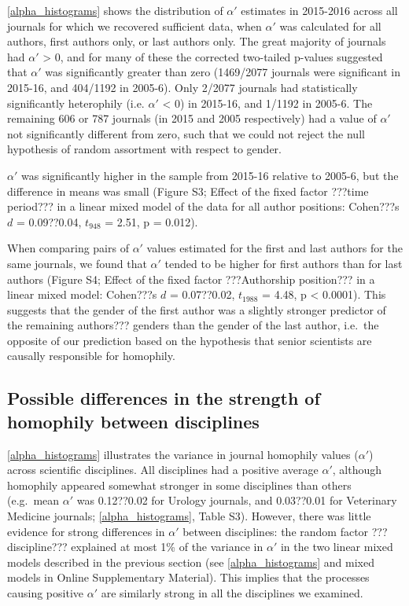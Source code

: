 \documentclass[12pt,]{article}
\begin{document}
\autoref{alpha_histograms} shows the distribution of \(\alpha'\)
estimates in 2015-2016 across all journals for which we recovered
sufficient data, when \(\alpha'\) was calculated for all authors, first
authors only, or last authors only. The great majority of journals had
\(\alpha'\) \textgreater{} 0, and for many of these the corrected
two-tailed p-values suggested that \(\alpha'\) was significantly greater
than zero (1469/2077 journals were significant in 2015-16, and 404/1192
in 2005-6). Only 2/2077 journals had statistically significantly
heterophily (i.e. \(\alpha'\) \textless{} 0) in 2015-16, and 1/1192 in
2005-6. The remaining 606 or 787 journals (in 2015 and 2005
respectively) had a value of \(\alpha'\) not significantly different
from zero, such that we could not reject the null hypothesis of random
assortment with respect to gender.

\(\alpha'\) was significantly higher in the sample from 2015-16 relative
to 2005-6, but the difference in means was small (Figure S3; Effect of
the fixed factor ???time period??? in a linear mixed model of the data
for all author positions: Cohen???s \(d\) = 0.09??0.04, \(t_{948}\) =
2.51, p = 0.012).

When comparing pairs of \(\alpha'\) values estimated for the first and
last authors for the same journals, we found that \(\alpha'\) tended to
be higher for first authors than for last authors (Figure S4; Effect of
the fixed factor ???Authorship position??? in a linear mixed model:
Cohen???s \(d\) = 0.07??0.02, \(t_{1988}\) = 4.48, p \textless{}
0.0001). This suggests that the gender of the first author was a
slightly stronger predictor of the remaining authors??? genders than the
gender of the last author, i.e.~the opposite of our prediction based on
the hypothesis that senior scientists are causally responsible for
homophily.

\subsection{Possible differences in the strength of homophily between
disciplines}\label{possible-differences-in-the-strength-of-homophily-between-disciplines}

\autoref{alpha_histograms} illustrates the variance in journal homophily
values (\(\alpha'\)) across scientific disciplines. All disciplines had
a positive average \(\alpha'\), although homophily appeared somewhat
stronger in some disciplines than others (e.g.~mean \(\alpha'\) was
0.12??0.02 for Urology journals, and 0.03??0.01 for Veterinary Medicine
journals; \autoref{alpha_histograms}, Table S3). However, there was
little evidence for strong differences in \(\alpha'\) between
disciplines: the random factor ???discipline??? explained at most 1\% of
the variance in \(\alpha'\) in the two linear mixed models described in
the previous section (see \autoref{alpha_histograms} and mixed models in
Online Supplementary Material). This implies that the processes causing
positive \(\alpha'\) are similarly strong in all the disciplines we
examined.
\end{document}
